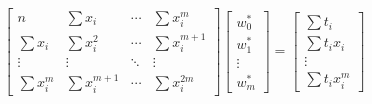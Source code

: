 \documentclass{article}
\begin{document}
\begin{equation}
    \begin{bmatrix}
        n           & \sum{x_i}         & \cdots & \sum{x_i^m}      \\[1em]
        \sum{x_i}   & \sum{x_i^2}       & \cdots & \sum{x_i^{m+1}}  \\[1em]
        \vdots      & \vdots            & \ddots & \vdots           \\[1em]
        \sum{x_i^m} & \sum{x_i^{m+1}}   & \cdots & \sum{x_i^{2m}}
    \end{bmatrix}\begin{bmatrix}
        w_0^*   \\[1em]
        w_1^*   \\[1em]
        \vdots  \\[1em]
        w_m^*
    \end{bmatrix} = \begin{bmatrix}
        \sum{t_i}       \\[1em]
        \sum{t_ix_i}    \\[1em]
        \vdots          \\[1em]
        \sum{t_ix_i^m}
    \end{bmatrix}
\end{equation}



\end{document}
